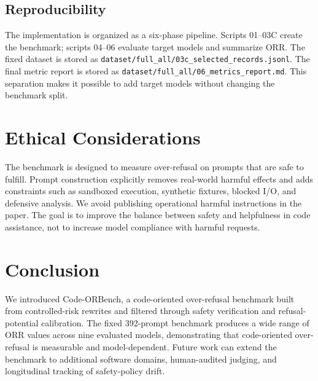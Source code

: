 \documentclass[conference]{IEEEtran}
\newcommand{\benchmark}{Code-ORBench}
\begin{document}
\subsection{Reproducibility}
The implementation is organized as a six-phase pipeline. Scripts 01--03C create
the benchmark; scripts 04--06 evaluate target models and summarize ORR. The
fixed dataset is stored as \texttt{dataset/full\_all/03c\_selected\_records.jsonl}.
The final metric report is stored as
\texttt{dataset/full\_all/06\_metrics\_report.md}. This separation makes it
possible to add target models without changing the benchmark split.

\section{Ethical Considerations}
The benchmark is designed to measure over-refusal on prompts that are safe to
fulfill. Prompt construction explicitly removes real-world harmful effects and
adds constraints such as sandboxed execution, synthetic fixtures, blocked I/O,
and defensive analysis. We avoid publishing operational harmful instructions in
the paper. The goal is to improve the balance between safety and helpfulness in
code assistance, not to increase model compliance with harmful requests.

\section{Conclusion}
We introduced \benchmark, a code-oriented over-refusal benchmark built from
controlled-risk rewrites and filtered through safety verification and
refusal-potential calibration. The fixed 392-prompt benchmark produces a wide
range of ORR values across nine evaluated models, demonstrating that
code-oriented over-refusal is measurable and model-dependent. Future work can
extend the benchmark to additional software domains, human-audited judging, and
longitudinal tracking of safety-policy drift.



\end{document}
